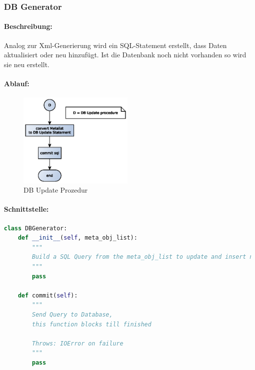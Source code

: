 \subsubsection{DB Generator}
\label{ssub:dbgen}
\paragraph{Beschreibung:}
\label{par:beschreibung_}
Analog zur Xml-Generierung wird ein SQL-Statement erstellt, dass Daten aktualisiert oder neu hinzufügt.
Ist die Datenbank noch nicht vorhanden so wird sie neu erstellt.
\paragraph{Ablauf:}
\label{par:ablauf_}
\hfill
\begin{figure}[H]
	\centering
	\includegraphics[width=0.5\textwidth]{design/backend/gfx/dbupdate.eps}
	\caption{DB Update Prozedur}
\end{figure}


\paragraph{Schnittstelle:}
\label{par:schnittstelle_}
\hfill
\begin{lstlisting}[language=python]
class DBGenerator:
    def __init__(self, meta_obj_list):
        """
        Build a SQL Query from the meta_obj_list to update and insert new items the Database 
        """
        pass

    def commit(self):
        """
        Send Query to Database,
        this function blocks till finished

        Throws: IOError on failure
        """
        pass
\end{lstlisting}


